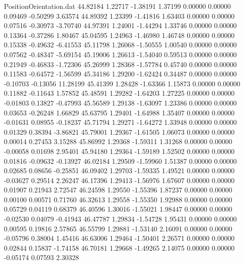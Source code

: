 \begin{filecontents}{PositionOrientation.dat}
  44.82184    1.22717   -1.38191     1.37199    0.00000    0.00000    0.09469   -0.50299    3.63574
  44.89392    1.23399   -1.41816     1.63403    0.00000    0.00000    0.07516   -0.30973   -3.70740
  44.97391    1.24001   -1.44294     1.33746    0.00000    0.00000    0.13364   -0.37286    1.80467
  45.04595    1.24963   -1.46980     1.46748    0.00000    0.00000    0.15338   -0.49632   -6.41553
  45.11798    1.26068   -1.50555     1.00540    0.00000    0.00000    0.07562   -0.48347   -5.69154
  45.19006    1.26613   -1.54040     0.59513    0.00000    0.00000    0.21949   -0.46833   -1.72306
  45.26999    1.28368   -1.57784     0.45740    0.00000    0.00000    0.11583   -0.64572   -1.56599
  45.34186    1.29200   -1.62424     0.34487    0.00000    0.00000   -0.10703   -0.13056   11.28199
  45.41399    1.28428   -1.63366     1.15873    0.00000    0.00000    0.11882   -0.11643    1.57852
  45.48591    1.29282   -1.64203     1.27225    0.00000    0.00000   -0.01803    0.13827   -0.47993
  45.56589    1.29138   -1.63097     1.23386    0.00000    0.00000    0.03653   -0.26248    1.66829
  45.63795    1.29401   -1.64988     1.35407    0.00000    0.00000   -0.01631    0.08955   -0.18237
  45.71794    1.29271   -1.64272     1.33948    0.00000    0.00000    0.01329    0.38394   -3.86821
  45.79001    1.29367   -1.61505     1.06073    0.00000    0.00000    0.00014    0.27453    3.15288
  45.86992    1.29368   -1.59311     1.31268    0.00000    0.00000   -0.00058    0.01698    2.95401
  45.94180    1.29364   -1.59189     1.52502    0.00000    0.00000    0.01816   -0.09632   -0.13927
  46.02184    1.29509   -1.59960     1.51387    0.00000    0.00000    0.02685    0.08656   -0.25851
  46.09402    1.29703   -1.59335     1.49521    0.00000    0.00000   -0.03627    0.29514    2.26247
  46.17396    1.29413   -1.56976     1.67607    0.00000    0.00000    0.01907    0.21943    2.72547
  46.24598    1.29550   -1.55396     1.87237    0.00000    0.00000    0.00100    0.00571    0.71760
  46.32613    1.29558   -1.55350     1.92988    0.00000    0.00000    0.05729    0.04119    0.68379
  46.40596    1.30016   -1.55021     1.98447    0.00000    0.00000   -0.02530    0.04079   -0.41943
  46.47787    1.29834   -1.54728     1.95431    0.00000    0.00000    0.00595    0.19816    2.57865
  46.55799    1.29881   -1.53140     2.16091    0.00000    0.00000   -0.05796    0.38004    1.45416
  46.63006    1.29464   -1.50401     2.26571    0.00000    0.00000    0.02844    0.15837   -1.74158
  46.70181    1.29668   -1.49265     2.14075    0.00000    0.00000   -0.05174    0.07593    2.30328

\end{filecontents}
